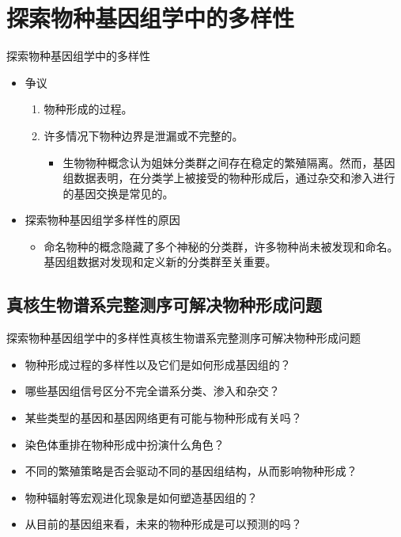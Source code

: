\documentclass{beamer}
\begin{document}
	\section{探索物种基因组学中的多样性}
	\begin{frame}{探索物种基因组学中的多样性}
		\begin{itemize}
			\item 争议
			\begin{enumerate}
				\item 物种形成的过程。
				\item 许多情况下物种边界是泄漏或不完整的。
				\begin{itemize}
					\item 生物物种概念认为姐妹分类群之间存在稳定的繁殖隔离。然而，基因组数据表明，在分类学上被接受的物种形成后，通过杂交和渗入进行的基因交换是常见的。
				\end{itemize}
			\end{enumerate}
			\quad
			\item 探索物种基因组学多样性的原因
			\begin{itemize}
				\item 命名物种的概念隐藏了多个神秘的分类群，许多物种尚未被发现和命名。基因组数据对发现和定义新的分类群至关重要。
			\end{itemize}
		\end{itemize}
	\end{frame}


	\subsection*{真核生物谱系完整测序可解决物种形成问题}
	\begin{frame}{探索物种基因组学中的多样性}{真核生物谱系完整测序可解决物种形成问题}
		\begin{itemize}
			\item 物种形成过程的多样性以及它们是如何形成基因组的？
			\item 哪些基因组信号区分不完全谱系分类、渗入和杂交？
			\item 某些类型的基因和基因网络更有可能与物种形成有关吗？
			\item 染色体重排在物种形成中扮演什么角色？
			\item 不同的繁殖策略是否会驱动不同的基因组结构，从而影响物种形成？
			\item 物种辐射等宏观进化现象是如何塑造基因组的？
			\item 从目前的基因组来看，未来的物种形成是可以预测的吗？
		\end{itemize}
	\end{frame}
\end{document}
